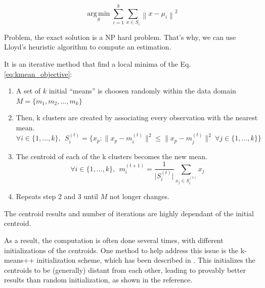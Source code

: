 \begin{equation} \label{eq:kmean_objective}
    \underset {S}{\operatorname {arg\,min} } \sum _{i=1}^{k} \sum _{x \in S_{i}} \left\| x - \mu_{i} \right\|^{2}
\end{equation}

Problem, the exact solution is a NP hard problem. That's why, we can use Lloyd's heuristic algorithm to compute an estimation.

It is an iterative method that find a local minima of the Eq. \ref{eq:kmean_objective}:

\begin{enumerate}
    \item A set of $k$ initial \enquote{means} is choosen randomly within the data domain $M = \{m_1, m_2, \ldots, m_k \}$
    
    \item Then, k clusters are created by associating every observation with the nearest mean.
    $$ \forall i \in \{ 1, \ldots, k \}, ~~ S_{i}^{(t)}= \big \{ x_{p}:{\big \|}x_{p}-m_{i}^{(t)}{\big \|}^{2}\leq {\big \|}x_{p}-m_{j}^{(t)}{\big \|}^{2} ~ \forall j \in \{ 1, \ldots, k \} \big \}$$
    
    \item The centroid of each of the k clusters becomes the new mean.
    $$ \forall i \in \{ 1, \ldots, k \}, ~~ m_{i}^{(t+1)}=\frac {1}{\lvert S_{i}^{(t)} \rvert } \sum _{x_{j} \in S_{i}^{(t)}} x_{j} $$
    
    \item Repeats step 2 and 3 until $M$ not longer changes.
\end{enumerate}

The centroid results and number of iterations are highly dependant of the initial centroid.

As a result, the computation is often done several times, with different initializations of the centroids. One method to help address this issue is the k-means++ initialization scheme, which has been described in \cite{Arthur2007}. This initializes the centroids to be (generally) distant from each other, leading to provably better results than random initialization, as shown in the reference.
